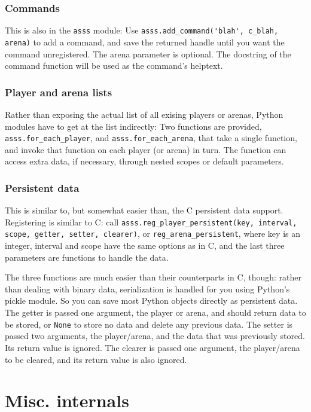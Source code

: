 \documentclass{article}
\begin{document}
\subsubsection{Commands}

This is also in the \verb/asss/ module: Use
\verb/asss.add_command('blah', c_blah, arena)/ to add a command, and
save the returned handle until you want the command unregistered. The
arena parameter is optional. The docstring of the command function will
be used as the command's helptext.


\subsubsection{Player and arena lists}

Rather than exposing the actual list of all exising players or arenas,
Python modules have to get at the list indirectly: Two functions are
provided, \verb/asss.for_each_player/, and \verb/asss.for_each_arena/,
that take a single function, and invoke that function on each player (or
arena) in turn. The function can access extra data, if necessary,
through nested scopes or default parameters.


\subsubsection{Persistent data}

This is similar to, but somewhat easier than, the C persistent data
support. Registering is similar to C: call
\texttt{asss.reg\_player\_persistent(key, interval, scope, getter,
setter, clearer)}, or \verb/reg_arena_persistent/, where key is an
integer, interval and scope have the same options as in C, and the last
three parameters are functions to handle the data.

The three functions are much easier than their counterparts in C,
though: rather than dealing with binary data, serialization is handled
for you using Python's pickle module. So you can save most Python
objects directly as persistent data. The getter is passed one argument,
the player or arena, and should return data to be stored, or \verb/None/
to store no data and delete any previous data. The setter is passed two
arguments, the player/arena, and the data that was previously stored.
Its return value is ignored. The clearer is passed one argument, the
player/arena to be cleared, and its return value is also ignored.



\section{Misc. internals}
\end{document}
